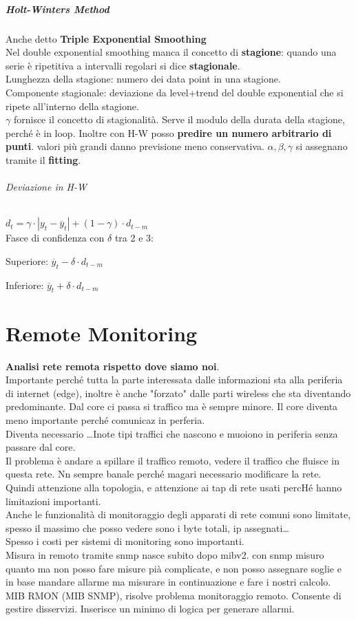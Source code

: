\documentclass[10pt]{book}
\begin{document}
\paragraph{Holt-Winters Method} Anche detto \textbf{Triple Exponential Smoothing}\\
Nel double exponential smoothing manca il concetto di \textbf{stagione}: quando una serie è ripetitiva a intervalli regolari si dice \textbf{stagionale}.\\
Lunghezza della stagione: numero dei data point in una stagione.\\
Componente stagionale: deviazione da level+trend del double exponential che si ripete all'interno della stagione.\\
$\gamma$ fornisce il concetto di stagionalità. Serve il modulo della durata della stagione, perché è in loop. Inoltre con H-W posso \textbf{predire un numero arbitrario di punti}. valori più grandi danno previsione meno conservativa. $\alpha, \beta, \gamma$ si assegnano tramite il \textbf{fitting}.
\subparagraph{Deviazione in H-W} $d_t = \gamma\cdot |y_t - \overline{y}_t| + (1 - \gamma)\cdot d_{t-m}$\\
Fasce di confidenza con $\delta$ tra 2 e 3:
\begin{list}{}{}
	\item Superiore: $\overline{y}_t - \delta\cdot d_{t-m}$
	\item Inferiore: $\overline{y}_t + \delta\cdot d_{t-m}$
\end{list}

\chapter{Remote Monitoring}
\textbf{Analisi rete remota rispetto dove siamo noi}.\\
Importante perché tutta la parte interessata dalle informazioni sta alla periferia di internet (edge), inoltre è anche "forzato" dalle parti wireless che sta diventando predominante. Dal core ci passa si traffico ma è sempre minore. Il core diventa meno importante perché comunicaz in perferia.\\
Diventa necessario \ldots Inote tipi traffici che nascono e muoiono in periferia senza passare dal core.\\
Il problema è andare a spillare il traffico remoto, vedere il traffico che fluisce in questa rete. Nn sempre banale perché magari necessario modificare la rete. Quindi attenzione alla topologia, e attenzione ai tap di rete usati percHé hanno limitazioni importanti.\\
Anche le funzionalità di monitoraggio degli apparati di rete comuni sono limitate, spesso il massimo che posso vedere sono i byte totali, ip assegnati\ldots\\
Spesso i costi per sistemi di monitoring sono importanti.\\
Misura in remoto tramite snmp nasce subito dopo mibv2. con snmp misuro quanto ma non posso fare misure pià complicate, e non posso assegnare soglie e in base mandare allarme ma misurare in continuazione e fare i nostri calcolo.\\
MIB RMON (MIB SNMP), risolve problema monitoraggio remoto. Consente di gestire disservizi. Inserisce un minimo di logica per generare allarmi.
\end{document}

